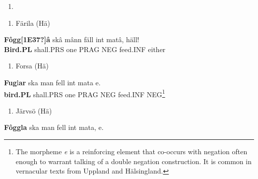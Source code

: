\begin{enumerate} %
\item 
\end{enumerate} %
\setcounter{listLFOxcviiileveli}{0}
\begin{enumerate} %
\item 
Färila (Hä)

\end{enumerate} %
\ea\label{}
\gll \textbf{Fôgg[1E37?]â} skâ  mânn  fäll  int  matâ,  häll!\\


\textbf{Bird.PL} shall.PRS  one  PRAG  NEG  feed.INF  either\\ %


\begin{enumerate} %
\item 
Forsa (Hä)

\end{enumerate} %
\ea\label{}
\gll \textbf{Fug}l\textbf{ar} ska  man  fell  int  mata  e.\\


\textbf{bird.PL} shall.PRS  one  PRAG  NEG  feed.INF  NEG\footnote{ The morpheme \textit{e} is a reinforcing element that co-occurs with negation often enough to warrant talking of a double negation construction. It is common in vernacular texts from Uppland and Hälsingland.}\\ %


\begin{enumerate} %
\item 
Järvsö (Hä)

\end{enumerate} %
\ea\label{}
\gll \textbf{Fôggla} ska  man  fell  int  mata,  e.\\


